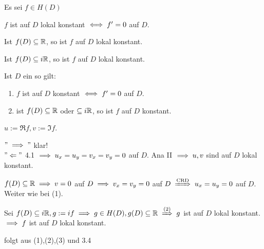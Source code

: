 \documentclass{article}
\def\gdw{\equizu}
\begin{document}
\begin{folgerung}%
Es sei $f \in H(D)$
\begin{liste}
\item $f$ ist auf $D$ lokal konstant $\gdw f' = 0$ auf $D$.
\item Ist $f(D) \subseteq \mathbb{R}$, so ist $f$ auf $D$ lokal konstant.
\item Ist $f(D) \subseteq  i\mathbb{R}$, so ist $f$ auf $D$ lokal konstant.
\item Ist $D$ ein  so gilt:
\begin{enumerate} 
\item $f$ ist auf $D$ konstant $\gdw f' = 0$ auf $D$.
\item ist $f(D) \subseteq \mathbb{R}$ oder $\subseteq i\mathbb{R}$, so ist $f$ auf $D$ konstant.
\end{enumerate}
\end{liste}
\end{folgerung}


\begin{beweis}
$u:=\Re f, v:=\Im f$.
\begin{liste}
\item $"\implies "$ klar! \\
$"\Leftarrow "$ 4.1 $\implies u_x = u_y = v_x = v_y = 0$ auf $D$. Ana II $\implies u,v$ sind auf $D$ lokal konstant.
\item $f(D) \subseteq \mathbb{R} \implies v = 0$ auf $D \implies v_x = v_y = 0$ auf $D \folgtnach{CRD} u_x = u_y = 0$ auf $D$. Weiter wie bei (1).
\item Sei $f(D) \subseteq i\MdR, g:=if \folgt g \in H(D), g(D) \subseteq \MdR \folgtnach{(2)} g$ ist auf $D$ lokal konstant. $\implies f$ ist auf $D$ lokal konstant.
\item folgt aus (1),(2),(3) und 3.4
\end{liste}
\end{beweis}
\end{document}
